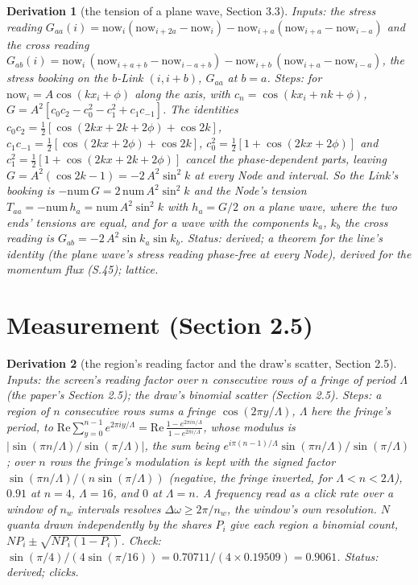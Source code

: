 \documentclass[pdflatex,sn-mathphys-num]{sn-jnl}
\newcommand{\num}{\mathrm{num}}
\theoremstyle{thmstyleone}
\newtheorem{derivation}{Derivation}
\begin{document}
\begin{derivation}[the tension of a plane wave, Section 3.3]
\emph{Inputs:} the stress reading $G_{aa}(i) = \mathrm{now}_i(\mathrm{now}_{i+2a} - \mathrm{now}_i) - \mathrm{now}_{i+a}(\mathrm{now}_{i+a} - \mathrm{now}_{i-a})$ and the cross reading $G_{ab}(i) = \mathrm{now}_i\,(\mathrm{now}_{i+a+b} - \mathrm{now}_{i-a+b}) - \mathrm{now}_{i+b}\,(\mathrm{now}_{i+a} - \mathrm{now}_{i-a})$, the stress booking on the $b$-Link $(i, i + b)$, $G_{aa}$ at $b = a$. \emph{Steps:} for $\mathrm{now}_i = A\cos(kx_i + \phi)$ along the axis, with $c_n = \cos(kx_i + nk + \phi)$, $G = A^2[c_0 c_2 - c_0^2 - c_1^2 + c_1 c_{-1}]$. The identities $c_0 c_2 = \frac{1}{2}[\cos(2kx + 2k + 2\phi) + \cos 2k]$, $c_1 c_{-1} = \frac{1}{2}[\cos(2kx + 2\phi) + \cos 2k]$, $c_0^2 = \frac{1}{2}[1 + \cos(2kx + 2\phi)]$ and $c_1^2 = \frac{1}{2}[1 + \cos(2kx + 2k + 2\phi)]$ cancel the phase-dependent parts, leaving $G = A^2(\cos 2k - 1) = -2\,A^2\sin^2 k$ at every Node and interval. So the Link's booking is $-\num\,G = 2\,\num\,A^2\sin^2 k$ and the Node's tension $T_{aa} = -\num\,h_a = \num\,A^2\sin^2 k$ with $h_a = G / 2$ on a plane wave, where the two ends' tensions are equal, and for a wave with the components $k_a$, $k_b$ the cross reading is $G_{ab} = -2\,A^2\sin k_a\sin k_b$.
 \emph{Status:} derived; a theorem for the line's identity (the plane wave's stress reading phase-free at every Node), derived for the momentum flux (S.45); lattice.
\end{derivation}

\section*{Measurement (Section 2.5)}

\begin{derivation}[the region's reading factor and the draw's scatter, Section 2.5]
\emph{Inputs:} the screen's reading factor over $n$ consecutive rows of a fringe of period $\Lambda$ (the paper's Section 2.5); the draw's binomial scatter (Section 2.5). \emph{Steps:} a region of $n$ consecutive rows sums a fringe $\cos(2\pi y / \Lambda)$, $\Lambda$ here the fringe's period, to $\mathrm{Re}\sum_{y = 0}^{n - 1} e^{2\pi i y / \Lambda} = \mathrm{Re}\,\frac{1 - e^{2\pi i n / \Lambda}}{1 - e^{2\pi i / \Lambda}}$, whose modulus is $|\sin(\pi n / \Lambda) / \sin(\pi / \Lambda)|$, the sum being $e^{i\pi(n - 1) / \Lambda}\sin(\pi n / \Lambda) / \sin(\pi / \Lambda)$; over $n$ rows the fringe's modulation is kept with the signed factor $\sin(\pi n / \Lambda) / (n\sin(\pi / \Lambda))$ (negative, the fringe inverted, for $\Lambda < n < 2\Lambda$), $0.91$ at $n = 4$, $\Lambda = 16$, and $0$ at $\Lambda = n$. A frequency read as a click rate over a window of $n_w$ intervals resolves $\Delta\omega \ge 2\pi / n_w$, the window's own resolution. $N$ quanta drawn independently by the shares $P_i$ give each region a binomial count, $NP_i \pm \sqrt{NP_i(1 - P_i)}$. \emph{Check:} $\sin(\pi / 4) / (4\sin(\pi / 16)) = 0.70711 / (4 \times 0.19509) = 0.9061$.
 \emph{Status:} derived; clicks.
\end{derivation}
\end{document}
